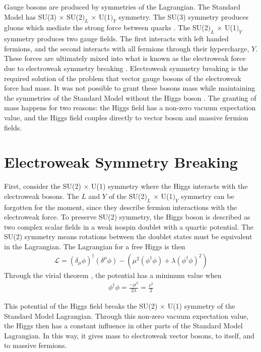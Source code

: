 Gauge bosons are produced by symmetries of the Lagrangian.
The Standard Model has SU(3) $\times$ SU(2$)_L$ $\times$ U(1$)_Y$ symmetry.
The SU(3) symmetry produces gluons which mediate the strong force between quarks \cite{PhysRevLett.30.1343}.
The SU(2$)_L$ $\times$ U(1$)_Y$ symmetry produces two gauge fields.
The first interacts with left handed fermions,
and the second interacts with all fermions through their hypercharge, $Y$.
These forces are ultimately mixed into what is known as the electroweak force
due to electroweak symmetry breaking \cite{PhysRevLett.19.1264}.
Electroweak symmetry breaking is the required solution of the problem that
vector gauge bosons of the electroweak force had mass.
It was not possible to grant these bosons mass while maintaining the symmetries of the Standard Model
without the Higgs boson \cite{PhysRevLett.13.321, PhysRevLett.13.508, PhysRevLett.13.585}.
The granting of mass happens for two reasons:
the Higgs field has a non-zero vacuum expectation value,
and the Higgs field couples directly to vector boson and massive fermion fields.

\section{Electroweak Symmetry Breaking}

First, consider the SU(2) $\times$ U(1) symmetry where the Higgs interacts with the electroweak bosons.
The $L$ and $Y$ of the SU(2$)_L$ $\times$ U(1$)_Y$ symmetry can be forgotten for the moment,
since they describe fermion interactions with the electroweak force.
To preserve SU(2) symmetry, the Higgs boson is described as two complex scalar fields in
a weak isospin doublet with a quartic potential.
The SU(2) symmetry means rotations between the doublet states must be equivalent in the Lagrangian.
The Lagrangian for a free Higgs is then
\begin{gather}
  \mathcal{L} = (\delta_\mu \phi)^\dagger (\delta^\mu \phi) - (\mu^2(\phi^\dagger\phi) + \lambda(\phi^\dagger\phi)^2) \label{eq:free}
\end{gather}
Through the virial theorem \cite{1930ZPhy...63..855F}, the potential has a minimum value when
\begin{gather}
  \phi^\dagger\phi = \frac{-\mu^2}{2\lambda} = \frac{v^2}{2} \label{eq:vacuum}
\end{gather}

This potential of the Higgs field breaks the SU(2) $\times$ U(1)
symmetry of the Standard Model Lagrangian.
Through this non-zero vacuum expectation value, the Higgs then has a constant influence
in other parts of the Standard Model Lagrangian.
In this way, it gives mass to electroweak vector bosons,
to itself, and to massive fermions.


